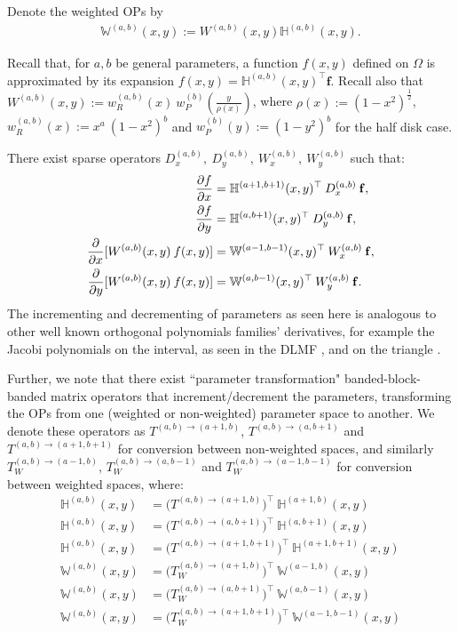 \documentclass[11pt, oneside]{article}   	%
\newcommand{\sotodo}{\todo[color=green]}
\newcommand{\half}{\frac{1}{2}}
\newcommand{\hdop}{H}
\newcommand{\bighdop}{\mathbb{\hdop}}
\newcommand{\Wab}{{W^{(a,b)}}}
\newcommand{\bighdopab}{\bighdop^{(a,b)}}
\newcommand{\genjac}{R}
\newcommand{\genjacw}{w_\genjac}
\newcommand{\bigW}{\mathbb{W}}
\newcommand{\bigWab}{\mathbb{W}^{(a,b)}}
\begin{document}
Denote the weighted OPs by
\begin{align*}
\bigWab(x,y) := \Wab(x,y) \bighdopab(x,y).
\end{align*}

Recall that, for $a, b$ be general parameters, a function $f(x,y)$ defined on $\Omega$ is approximated by its expansion $f(x,y) = \bighdopab(x,y)^\top \mathbf{f}$. Recall also that $\Wab(x,y) := \genjacw^{(a,b)}(x) \: w_P^{(b)}(\frac{y}{\rho(x)})$, where $\rho(x) := (1-x^2)^\half$, $\genjacw^{(a,b)}(x) := x^a \: (1-x^2)^b$ and $w_P^{(b)}(y) := (1-y^2)^b$ for the half disk case.

There exist sparse \sotodo{Explain why these are sparse} operators \(D_x^{(a,b)}, \: D_y^{(a,b)}, \: W_x^{(a,b)}, \: W_y^{(a,b)}\) such that:
\begin{align*}
{\partial f \over \partial x}&= \bighdop^{(a+1,b+1)}(x,y)^\top \: D_x^{(a,b)} \: \mathbf{f}, \\
{\partial f \over \partial y} &= \bighdop^{(a,b+1)}(x,y)^\top \: D_y^{(a,b)} \: \mathbf{f}, \\
{\partial \over \partial x}[\Wab(x,y) \: f(x,y)] &= \bigW^{(a-1,b-1)}(x,y)^\top \: W_x^{(a,b)} \: \mathbf{f}, \\
{\partial \over \partial y}[\Wab(x,y) \: f(x,y)] &= \bigW^{(a,b-1)}(x,y)^\top \: W_y^{(a,b)} \: \mathbf{f}.
\end{align*}
The incrementing and decrementing of parameters as seen here is analogous to other well known orthogonal polynomials families' derivatives, for example the Jacobi polynomials on the interval, as seen in the DLMF \cite[(18.9.3)]{DLMF}, and on the triangle \cite{olver2018recurrence}.

Further, we note that there exist ``parameter transformation" banded-block-banded matrix operators that increment/decrement the parameters, transforming the OPs from one (weighted or non-weighted) parameter space to another. We denote these operators as $T^{(a,b)\to(a+1,b)}$, $T^{(a,b)\to(a,b+1)}$ and $T^{(a,b)\to(a+1,b+1)}$ for conversion between non-weighted spaces, and similarly $T_W^{(a,b)\to(a-1,b)}$, $T_W^{(a,b)\to(a,b-1)}$ and $T_W^{(a,b)\to(a-1,b-1)}$ for conversion between weighted spaces, where:
\begin{align*}
\bighdop^{(a,b)}(x,y) &= \Big(T^{(a,b)\to(a+1,b)} \Big)^\top \: \bighdop^{(a+1,b)}(x,y) \\
\bighdop^{(a,b)}(x,y) &= \Big(T^{(a,b)\to(a,b+1)} \Big)^\top \: \bighdop^{(a,b+1)}(x,y) \\
\bighdop^{(a,b)}(x,y) &= \Big(T^{(a,b)\to(a+1,b+1)} \Big)^\top \: \bighdop^{(a+1,b+1)}(x,y) \\
\bigW^{(a,b)}(x,y) &= \Big(T_W^{(a,b)\to(a+1,b)} \Big)^\top \: \bigW^{(a-1,b)}(x,y) \\
\bigW^{(a,b)}(x,y) &= \Big(T_W^{(a,b)\to(a,b+1)} \Big)^\top \: \bigW^{(a,b-1)}(x,y) \\
\bigW^{(a,b)}(x,y) &= \Big(T_W^{(a,b)\to(a+1,b+1)} \Big)^\top \: \bigW^{(a-1,b-1)}(x,y) \\
\end{align*}
\end{document}
